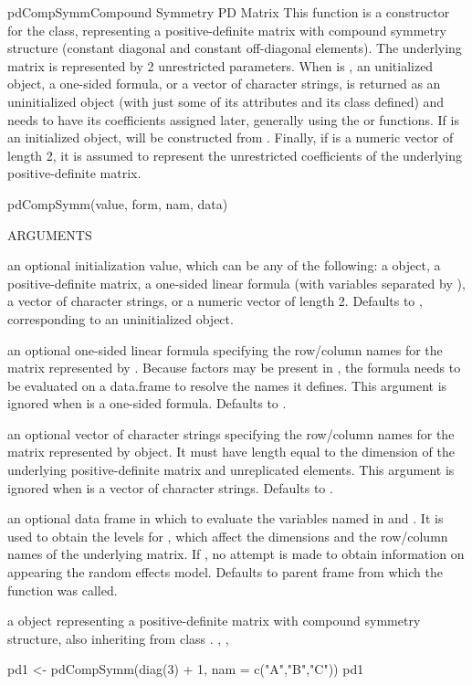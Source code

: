 \documentclass[pdftex]{article} \usepackage{url,graphicx}
\begin{document}
\begin{Helpfile}{pdCompSymm}{Compound Symmetry PD Matrix}
This function is a constructor for the  class,
representing a positive-definite matrix with compound symmetry
structure (constant diagonal and constant off-diagonal elements). The
underlying matrix is represented by 2 unrestricted parameters.
When  is , an unitialized 
object, a one-sided formula, or a vector of character strings,
 is returned  as an uninitialized 
object (with just some of its  attributes and its class defined) and
needs to have its coefficients assigned later, generally using the
 or  functions. If  is an initialized
 object,  will be constructed from 
. Finally, if  is a numeric vector
of length 2, it is assumed to represent the unrestricted coefficients
of the underlying positive-definite matrix.
\begin{Example}
pdCompSymm(value, form, nam, data)
\end{Example}
\begin{Argument}{ARGUMENTS}
\item[\Co{value:}]
an optional initialization value, which can be any of the
following: a  object, a positive-definite
matrix, a one-sided linear formula (with variables separated by
\Co{+}), a vector of character strings, or a numeric
vector of length 2. Defaults to , corresponding to
an uninitialized object.
\item[\Co{form:}]
an optional one-sided linear formula specifying the
row/column names for the matrix represented by . Because
factors may be present in , the formula needs to be
evaluated on a data.frame to resolve the names it defines. This
argument is ignored when  is a one-sided
formula. Defaults to .
\item[\Co{nam:}]
an optional vector of character strings specifying the
row/column names for the matrix represented by object. It must have 
length equal to the dimension of the underlying positive-definite
matrix and unreplicated elements. This argument is ignored when
 is a vector of character strings. Defaults to
.
\item[\Co{data:}]
an optional data frame in which to evaluate the variables
named in  and . It is used to
obtain the levels for , which affect the
dimensions and the row/column names of the underlying matrix. If
, no attempt is made to obtain information on 
 appearing the random effects model. Defaults to parent
frame from which the function was called.
\end{Argument}
a  object representing a positive-definite
matrix with compound symmetry structure, also inheriting from class
.
, ,
\need 15pt
\vspace{-16pt} 
\begin{Example}
pd1 <- pdCompSymm(diag(3) + 1, nam = c("A","B","C"))
pd1
\end{Example}
\end{Helpfile}
\end{document}
